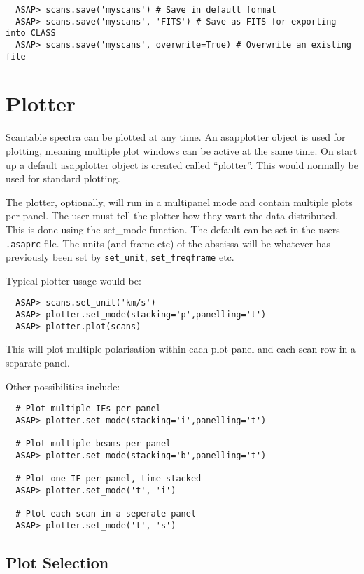\documentclass[11pt]{article}
\newcommand{\cmd}[1]{{\tt #1}}
\begin{document}
\begin{verbatim}
  ASAP> scans.save('myscans') # Save in default format
  ASAP> scans.save('myscans', 'FITS') # Save as FITS for exporting into CLASS
  ASAP> scans.save('myscans', overwrite=True) # Overwrite an existing file
\end{verbatim}

\section{Plotter}

Scantable spectra can be plotted at any time. An asapplotter object is
used for plotting, meaning multiple plot windows can be active at the
same time. On start up a default asapplotter object is created called
``plotter''. This would normally be used for standard plotting.

The plotter, optionally, will run in a multipanel mode and contain
multiple plots per panel. The user must tell the plotter how they want
the data distributed. This is done using the set\_mode function. The
default can be set in the users {\tt .asaprc} file. The units (and frame
etc) of the abscissa will be whatever has previously been set by
\cmd{set\_unit}, \cmd{set\_freqframe} etc.

Typical plotter usage would be:

\begin{verbatim}
  ASAP> scans.set_unit('km/s')
  ASAP> plotter.set_mode(stacking='p',panelling='t')
  ASAP> plotter.plot(scans)
\end{verbatim}

This will plot multiple polarisation within each plot panel and each
scan row in a separate panel.

Other possibilities include:

\begin{verbatim}
  # Plot multiple IFs per panel
  ASAP> plotter.set_mode(stacking='i',panelling='t')

  # Plot multiple beams per panel
  ASAP> plotter.set_mode(stacking='b',panelling='t')

  # Plot one IF per panel, time stacked
  ASAP> plotter.set_mode('t', 'i')

  # Plot each scan in a seperate panel
  ASAP> plotter.set_mode('t', 's')

\end{verbatim}

\subsection{Plot Selection}
\label{sec:plotter_cursor}
\end{document}
